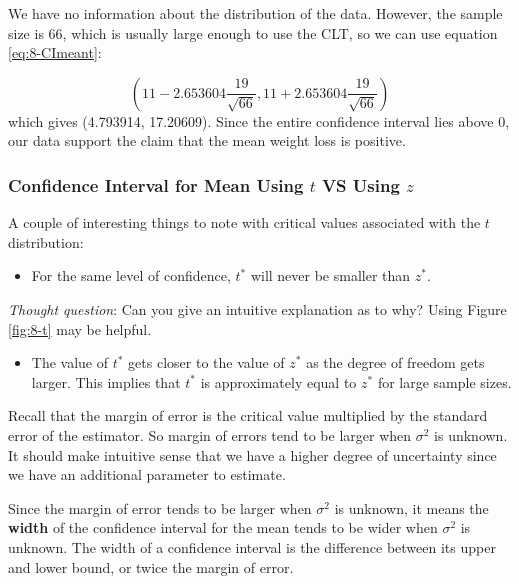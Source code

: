 \documentclass[
]{book}
\providecommand{\tightlist}{%
  \setlength{\itemsep}{0pt}\setlength{\parskip}{0pt}}
\begin{document}
We have no information about the distribution of the data. However, the sample size is 66, which is usually large enough to use the CLT, so we can use equation \eqref{eq:8-CImeant}:

\[
\left( 11 - 2.653604 \frac{19}{\sqrt{66}} , 11 + 2.653604 \frac{19}{\sqrt{66}} \right)
\]
which gives (4.793914, 17.20609). Since the entire confidence interval lies above 0, our data support the claim that the mean weight loss is positive.

\hypertarget{confidence-interval-for-mean-using-t-vs-using-z}{%
\subsubsection{\texorpdfstring{Confidence Interval for Mean Using \(t\) VS Using \(z\)}{Confidence Interval for Mean Using t VS Using z}}\label{confidence-interval-for-mean-using-t-vs-using-z}}

A couple of interesting things to note with critical values associated with the \(t\) distribution:

\begin{itemize}
\tightlist
\item
  For the same level of confidence, \(t^*\) will never be smaller than \(z^*\).
\end{itemize}

\emph{Thought question}: Can you give an intuitive explanation as to why? Using Figure \ref{fig:8-t} may be helpful.

\begin{itemize}
\tightlist
\item
  The value of \(t^*\) gets closer to the value of \(z^*\) as the degree of freedom gets larger. This implies that \(t^*\) is approximately equal to \(z^*\) for large sample sizes.
\end{itemize}

Recall that the margin of error is the critical value multiplied by the standard error of the estimator. So margin of errors tend to be larger when \(\sigma^2\) is unknown. It should make intuitive sense that we have a higher degree of uncertainty since we have an additional parameter to estimate.

Since the margin of error tends to be larger when \(\sigma^2\) is unknown, it means the \textbf{width} of the confidence interval for the mean tends to be wider when \(\sigma^2\) is unknown. The width of a confidence interval is the difference between its upper and lower bound, or twice the margin of error.
\end{document}
